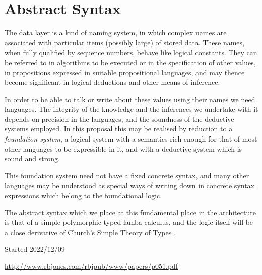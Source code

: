 \documentclass[10pt,titlepage]{article}
\begin{document}
\section{Abstract Syntax}

The data layer is a kind of naming system, in which complex names are associated with particular items (possibly large) of stored data.
These names, when fully qualified by sequence numbers, behave like logical constants.
They can be referred to in algorithms to be executed or in the specification of other values, in propositions expressed in suitable propositional languages, and may thence become significant in logical deductions and other means of inference.

In order to be able to talk or write about these values using their names we need languages.
The integrity of the knowledge and the inferences we undertake with it depends on precision in the languages, and the soundness of the deductive systems employed.
In this proposal this may be realised by reduction to a \emph{foundation system}, a logical system with a semantics rich enough for that of most other languages to be expressible in it, and with a deductive system which is sound and strong.

This foundation system need not have a fixed concrete syntax, and many other languages may be understood as special ways of writing down in concrete syntax expressions which belong to the foundational logic.

The abstract syntax which we place at this fundamental place in the architecture is that of a simple polymorphic typed lamba calculus, and the logic itself will be a close derivative of Church's Simple Theory of Types \cite{Church40}.


\appendix

{}





\tiny{
Started 2022/12/09


\href{http://www.rbjones.com/rbjpub/www/papers/p051.pdf}{http://www.rbjones.com/rbjpub/www/papers/p051.pdf}

}%
\end{document}
